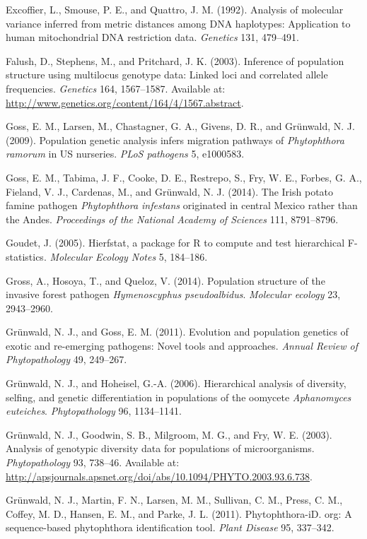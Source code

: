 \documentclass{frontiersSCNS} %
\begin{document}
Excoffier, L., Smouse, P. E., and Quattro, J. M. (1992). Analysis of
molecular variance inferred from metric distances among DNA haplotypes:
Application to human mitochondrial DNA restriction data. \emph{Genetics}
131, 479--491.

Falush, D., Stephens, M., and Pritchard, J. K. (2003). Inference of
population structure using multilocus genotype data: Linked loci and
correlated allele frequencies. \emph{Genetics} 164, 1567--1587.
Available at: \url{http://www.genetics.org/content/164/4/1567.abstract}.

Goss, E. M., Larsen, M., Chastagner, G. A., Givens, D. R., and
Gr{\"{u}}nwald, N. J. (2009). Population genetic analysis infers migration
pathways of \emph{Phytophthora ramorum} in US nurseries. \emph{PLoS
pathogens} 5, e1000583.

Goss, E. M., Tabima, J. F., Cooke, D. E., Restrepo, S., Fry, W. E.,
Forbes, G. A., Fieland, V. J., Cardenas, M., and Gr{\"{u}}nwald, N. J.
(2014). The Irish potato famine pathogen \emph{Phytophthora infestans}
originated in central Mexico rather than the Andes. \emph{Proceedings of
the National Academy of Sciences} 111, 8791--8796.

Goudet, J. (2005). Hierfstat, a package for R to compute and test
hierarchical F-statistics. \emph{Molecular Ecology Notes} 5, 184--186.

Gross, A., Hosoya, T., and Queloz, V. (2014). Population structure of
the invasive forest pathogen \emph{Hymenoscyphus pseudoalbidus}.
\emph{Molecular ecology} 23, 2943--2960.

Gr\"{u}nwald, N. J., and Goss, E. M. (2011). Evolution and population
genetics of exotic and re-emerging pathogens: Novel tools and
approaches. \emph{Annual Review of Phytopathology} 49, 249--267.

Gr{\"{u}}nwald, N. J., and Hoheisel, G.-A. (2006). Hierarchical analysis of
diversity, selfing, and genetic differentiation in populations of the
oomycete \emph{Aphanomyces euteiches}. \emph{Phytopathology} 96,
1134--1141.

Gr\"{u}nwald, N. J., Goodwin, S. B., Milgroom, M. G., and Fry, W. E. (2003).
Analysis of genotypic diversity data for populations of microorganisms.
\emph{Phytopathology} 93, 738--46. Available at:
\url{http://apsjournals.apsnet.org/doi/abs/10.1094/PHYTO.2003.93.6.738}.

Gr{\"{u}}nwald, N. J., Martin, F. N., Larsen, M. M., Sullivan, C. M., Press,
C. M., Coffey, M. D., Hansen, E. M., and Parke, J. L. (2011).
Phytophthora-iD. org: A sequence-based phytophthora identification tool.
\emph{Plant Disease} 95, 337--342.
\end{document}
